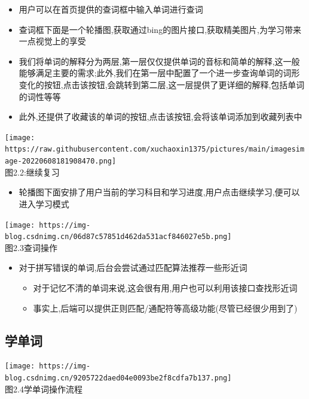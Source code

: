 \documentclass[
]{article}
\begin{document}
\begin{itemize}
\item
  用户可以在首页提供的查词框中输入单词进行查词
\item
  查词框下面是一个轮播图,获取通过bing的图片接口,获取精美图片,为学习带来一点视觉上的享受
\item
  我们将单词的解释分为两层,第一层仅仅提供单词的音标和简单的解释,这一般能够满足主要的需求;此外,我们在第一层中配置了一个进一步查询单词的词形变化的按钮,点击该按钮,会跳转到第二层,这一层提供了更详细的解释,包括单词的词性等等
\item
  此外,还提供了收藏该的单词的按钮,点击该按钮,会将该单词添加到收藏列表中
\end{itemize}

\texttt{[image: https://raw.githubusercontent.com/xuchaoxin1375/pictures/main/imagesimage-20220608181908470.png]}\\
图2.2:继续复习

\begin{itemize}
\item
  轮播图下面安排了用户当前的学习科目和学习进度,用户点击继续学习,便可以进入学习模式
\end{itemize}

\texttt{[image: https://img-blog.csdnimg.cn/06d87c57851d462da531acf846027e5b.png]}\\
图2.3查词操作

\begin{itemize}
\item
  对于拼写错误的单词,后台会尝试通过匹配算法推荐一些形近词

  \begin{itemize}
  \item
    对于记忆不清的单词来说,这会很有用,用户也可以利用该接口查找形近词
  \item
    事实上,后端可以提供正则匹配/通配符等高级功能(尽管已经很少用到了)
  \end{itemize}
\end{itemize}

\hypertarget{ux5b66ux5355ux8bcd-2}{%
\subsection{学单词}\label{ux5b66ux5355ux8bcd-2}}

\texttt{[image: https://img-blog.csdnimg.cn/9205722daed04e0093be2f8cdfa7b137.png]}\\
图2.4学单词操作流程
\end{document}
